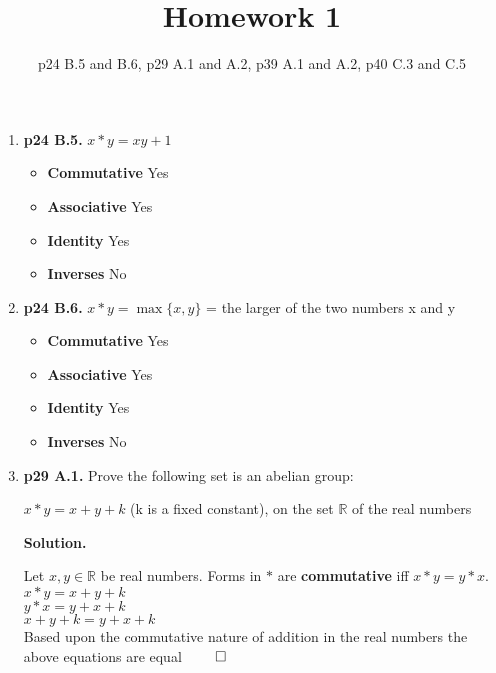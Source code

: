 \documentclass[11pt]{article}
\begin{document}
\title{Homework 1}
\date{p24 B.5 and B.6, p29 A.1 and A.2, p39 A.1 and A.2, p40 C.3 and C.5}
\maketitle

\thispagestyle{fancy}  
\pagestyle{fancy}      

\begin{enumerate}

\item {\bfseries p24 B.5.}
  $x*y = xy + 1$
  \begin{itemize}
  \item {\bfseries Commutative} Yes
  \item {\bfseries Associative} Yes
  \item {\bfseries Identity} Yes
  \item {\bfseries Inverses} No
  \end{itemize} 
 
\item {\bfseries p24 B.6.}
  $x*y = \max\{x,y\}$ = the larger of the two numbers x and y
  \begin{itemize}
  \item {\bfseries Commutative} Yes
  \item {\bfseries Associative} Yes
  \item {\bfseries Identity} Yes
  \item {\bfseries Inverses} No
  \end{itemize} 

\newpage

\item {\bfseries p29 A.1.}
  Prove the following set is an abelian group:
  
  $x*y = x + y + k$ (k is a fixed constant), on the set $\mathbb{R}$ of the real numbers
  
  {\bfseries Solution.}
  
  Let $x, y \in \mathbb{R}$ be real numbers. Forms in $*$ are {\bfseries commutative} iff $x*y = y*x$. \\
  $x*y = x + y + k$ \\
  $y*x = y + x + k$ \\
  $x + y + k = y + x + k$ \\
  Based upon the commutative nature of addition in the real numbers the above equations are equal $\qed$\\
  

\end{enumerate}
\end{document}

